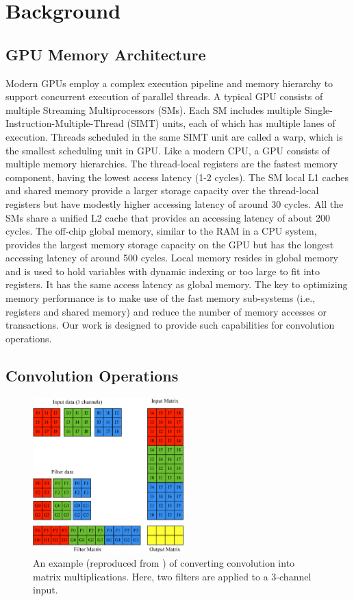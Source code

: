 
\section{Background}
\subsection{GPU Memory Architecture}
Modern GPUs employ a complex execution pipeline and memory hierarchy to support concurrent execution of parallel threads. A typical GPU
consists of multiple Streaming Multiprocessors (SMs). Each SM includes multiple Single-Instruction-Multiple-Thread (SIMT) units, each of
which has multiple lanes of execution. Threads scheduled in the same SIMT unit are called a warp, which is the smallest scheduling unit in
GPU. Like a modern CPU, a GPU consists of multiple memory hierarchies. The thread-local registers are the fastest memory component, having
the lowest access latency (1-2 cycles). The SM local L1 caches and shared memory provide a larger storage capacity over the thread-local
registers but have modestly higher accessing latency of around 30 cycles. All the SMs share a unified L2 cache that provides an accessing
latency of about 200 cycles. The off-chip global memory, similar to the RAM in a CPU system, provides the largest memory storage capacity
on the GPU but has the longest accessing latency of around 500 cycles. Local memory resides in global memory and is used to hold variables with dynamic indexing or too large to fit into registers. It has the same access latency as global memory. The key to optimizing memory performance is to make use of the fast
memory sub-systems (i.e., registers and shared memory) and reduce the number of memory accesses or transactions. Our work is designed to
provide such capabilities for convolution operations.

\subsection{Convolution Operations}
\begin{figure}[t!]
\centering
  \includegraphics[width=0.75\columnwidth,height=6cm]{./figure/convlowering.eps}
  \caption{An example (reproduced from \cite{ChetlurWVCTCS14}) of converting convolution into matrix multiplications. Here, two filters are applied to a 3-channel input.}
  \label{fig:convlowering}
  \vspace{-3mm}
\end{figure}

